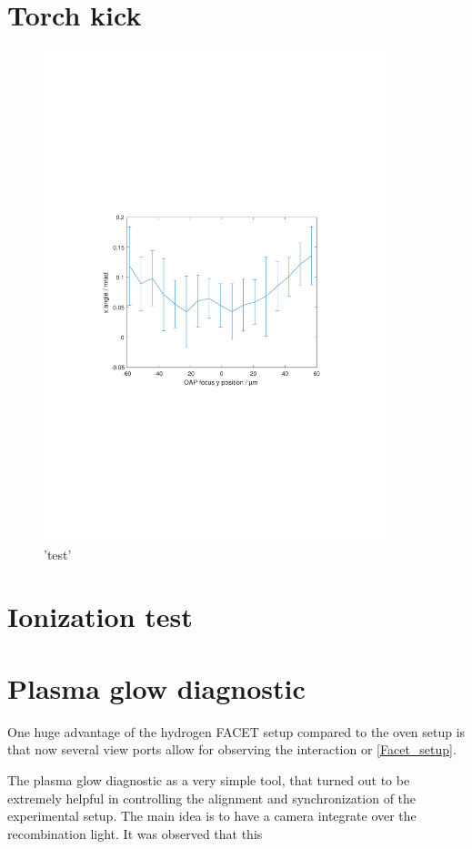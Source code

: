 \section{Torch kick}
\begin{figure}[htbp]
\includegraphics[width=0.9\textwidth]{experiment/images/raw/Torch_rollscan.pdf}
\caption{'test'}
\label{img:TochKick}
\end{figure}

\section{Ionization test}

\section{Plasma glow diagnostic}
One huge advantage of the hydrogen FACET setup compared to the oven setup is that now several view ports allow for observing the interaction or \ref{Facet_setup}.

The plasma glow diagnostic as a very simple tool, that turned out to be extremely helpful in controlling the 
alignment and synchronization of the experimental setup. The main idea is to have a camera integrate over the recombination light. It was observed that this 



